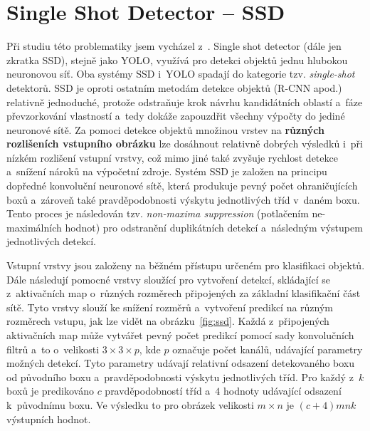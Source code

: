 



\section{Single Shot Detector -- SSD}
\label{ssdTeorie}
Při studiu této problematiky jsem vycházel z~\cite{ssd}. Single shot detector (dále jen zkratka SSD), stejně jako YOLO, využívá pro detekci objektů jednu hlubokou neuronovou síť. Oba systémy SSD i~YOLO spadají do kategorie tzv. \emph{single-shot} detektorů. SSD je oproti ostatním metodám detekce objektů (R-CNN apod.) relativně jednoduché, protože odstraňuje krok návrhu kandidátních oblastí a~fáze převzorkování vlastností a~tedy dokáže zapouzdřit všechny výpočty do jediné neuronové sítě. Za pomoci detekce objektů množinou vrstev na \textbf{různých rozlišeních vstupního obrázku} lze dosáhnout relativně dobrých výsledků i~při nízkém rozlišení vstupní vrstvy, což mimo jiné také zvyšuje rychlost detekce a~snížení nároků na výpočetní zdroje. Systém SSD je založen na principu dopředné konvoluční neuronové sítě, která produkuje pevný počet ohraničujících boxů a~zároveň také pravděpodobnosti výskytu jednotlivých tříd v~daném boxu. Tento proces je následován tzv. \emph{non-maxima suppression} (potlačením ne-maximálních hodnot) pro odstranění duplikátních detekcí a~následným výstupem jednotlivých detekcí.

Vstupní vrstvy jsou založeny na běžném přístupu určeném pro klasifikaci objektů. Dále následují pomocné vrstvy sloužící pro vytvoření detekcí, skládající se z~aktivačních map o~různých rozměrech připojených za základní klasifikační část sítě. Tyto vrstvy slouží ke snížení rozměrů a~vytvoření predikcí na různým rozměrech vstupu, jak lze vidět na obrázku~\ref{fig:ssd}. Každá z~připojených aktivačních map může vytvářet pevný počet predikcí pomocí sady konvolučních filtrů a~to o~velikosti $3 \times 3 \times p$, kde $p$ označuje počet kanálů, udávající parametry možných detekcí. Tyto parametry udávají relativní odsazení detekovaného boxu od původního boxu a~pravděpodobnosti výskytu jednotlivých tříd. Pro každý z~$k$ boxů je predikováno $c$ pravděpodobností tříd a~$4$ hodnoty udávající odsazení k~původnímu boxu. Ve výsledku to pro obrázek velikosti $m \times n$ je $(c+4)mnk$ výstupních hodnot.

